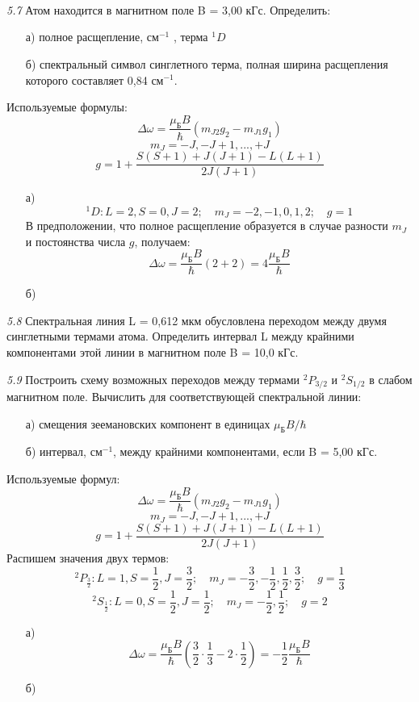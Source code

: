 	\emph{\\\\\\5.7 }
		Атом находится в магнитном поле B = 3,00 кГс. Определить: 
		\vspace*{-1em}
		\begin{itemize}\itemsep-8pt
			\item[а)] полное расщепление, \( \text{см}^{-1} \) , терма \( ^1D \) 
			\item[б)] спектральный символ синглетного терма,
			полная ширина расщепления которого составляет 0,84 \( \text{см}^{-1} \).
		\end{itemize}
		Используемые формулы: 
		\[ \Delta\omega = \frac{\mu_\text{Б}B}{\hbar}(m_{J2}g_{2}-m_{J1}g_{1}) \]
		\[ m_J = -J, -J+1, ..., +J \]
		\[ g = 1 + \frac{S(S+1)+J(J+1)-L(L+1)}{2J(J+1)} \]
		\begin{itemize}\itemsep-8pt
			\item[а)] 
			\[ 
				^1D: L=2, S=0, J=2;\quad
				m_J = -2, -1, 0, 1, 2;\quad
				g = 1
			\]
			В предположении, что полное расщепление образуется в случае разности
			\( m_J \) и постоянства числа \( g \), получаем:
			\[ 
				\Delta\omega = \frac{\mu_\text{Б}B}{\hbar}(2+2) 
				= 4\frac{\mu_\text{Б}B}{\hbar} 
			\]
			\item[б)]
		\end{itemize}

	\emph{5.8 }
		Спектральная линия L = 0,612 мкм обусловлена переходом между двумя
		синглетными термами атома. Определить интервал L между крайними
		компонентами этой линии в магнитном поле B = 10,0 кГс.

	\emph{5.9 }
		Построить схему возможных переходов между термами \( ^2P_{3/2} \) и 
		\( ^2S_{1/2} \) в слабом магнитном поле. Вычислить для соответствующей 
		спектральной линии:
		\vspace*{-2em}
		\begin{itemize}\itemsep-8pt
			\item[а)] смещения зеемановских компонент в единицах 
			\( \mu_\text{Б}B/\hbar \)
			\item[б)] интервал, \( \text{см}^{-1} \), между крайними 
			компонентами, если B = 5,00 кГс.
		\end{itemize}
		Используемые формул:
		\[ \Delta\omega = \frac{\mu_\text{Б}B}{\hbar}(m_{J2}g_{2}-m_{J1}g_{1}) \]
		\[ m_J = -J, -J+1, ..., +J \]
		\[ g = 1 + \frac{S(S+1)+J(J+1)-L(L+1)}{2J(J+1)} \]
		Распишем значения двух термов:
		\[ 
			^2P_\frac{3}{2}: L = 1, S = \frac{1}{2}, J = \frac{3}{2};\quad
			m_J = -\frac{3}{2}, -\frac{1}{2}, \frac{1}{2}, \frac{3}{2};\quad
			g = \frac{1}{3}
		\]
		\[ 
			^2S_\frac{1}{2}: L = 0, S = \frac{1}{2}, J = \frac{1}{2};\quad
			m_J = -\frac{1}{2}, \frac{1}{2};\quad
			g = 2
		\]
		\begin{itemize}\itemsep-8pt
			\item[а)]
			\[ 
				\Delta\omega = \frac{\mu_\text{Б}B}{\hbar}
				(\frac{3}{2}\cdot\frac{1}{3} - 2\cdot\frac{1}{2}) = 
				-\frac{1}{2}\frac{\mu_\text{Б}B}{\hbar}
			\]
			\item[б)]
		\end{itemize}

